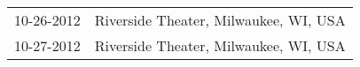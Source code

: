 \begin{supertabular}{ll}
 10-26-2012 &  Riverside Theater, Milwaukee, WI, USA \\
 10-27-2012 &  Riverside Theater, Milwaukee, WI, USA \\
\end{supertabular}
